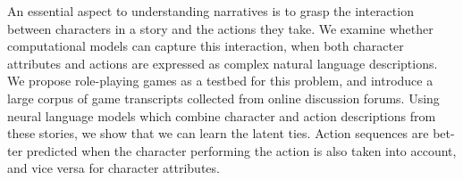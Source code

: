 An essential aspect to understanding narratives is to grasp the interaction between characters in a story and the actions they take. We examine whether computational models can capture this interaction, when both character attributes and actions are expressed as complex natural language descriptions. We propose role-playing games as a testbed for this problem, and introduce a large corpus of game transcripts collected from online discussion forums. Using neural language models which combine character and action descriptions from these stories, we show that we can learn the latent ties. Action sequences are bet- ter predicted when the character performing the action is also taken into account, and vice versa for character attributes.
